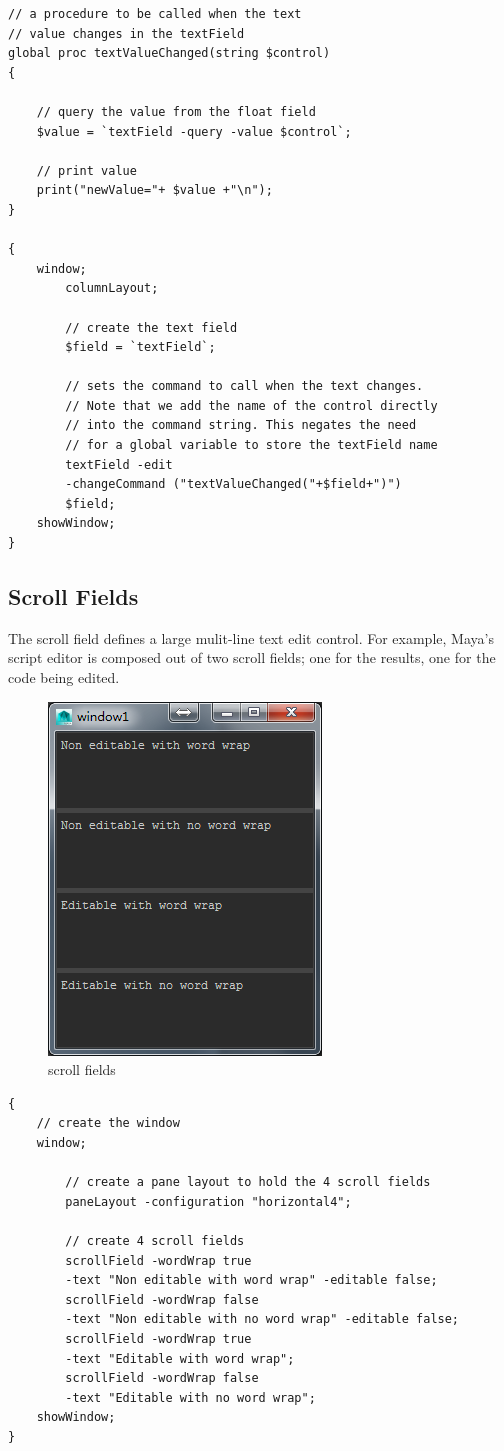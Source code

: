\begin{lstlisting}
// a procedure to be called when the text 
// value changes in the textField
global proc textValueChanged(string $control)
{

	// query the value from the float field
	$value = `textField -query -value $control`;
	
	// print value
	print("newValue="+ $value +"\n");
}

{	
	window;
		columnLayout;
		
		// create the text field
		$field = `textField`;
		
		// sets the command to call when the text changes.
		// Note that we add the name of the control directly
		// into the command string. This negates the need 
		// for a global variable to store the textField name
		textField -edit 
		-changeCommand ("textValueChanged("+$field+")")
		$field;
	showWindow;
}
\end{lstlisting}

\subsection{Scroll Fields}
The scroll field defines a large mulit-line text edit control. For example, Maya's script editor is composed out of two scroll fields; one for the results, one for the code being edited.

\begin{figure}[tbh]
	\centering
	\includegraphics[width=0.4\linewidth]{figures/GUI/scrollFields}
	\caption{scroll fields}
	\label{fig:scrollfields}
\end{figure}

\begin{lstlisting}
{		
	// create the window
	window;
	
		// create a pane layout to hold the 4 scroll fields
		paneLayout -configuration "horizontal4";
		
		// create 4 scroll fields
		scrollField -wordWrap true 
		-text "Non editable with word wrap" -editable false;
		scrollField -wordWrap false 
		-text "Non editable with no word wrap" -editable false;
		scrollField -wordWrap true 
		-text "Editable with word wrap";
		scrollField -wordWrap false 
		-text "Editable with no word wrap";
	showWindow;
}
\end{lstlisting}

